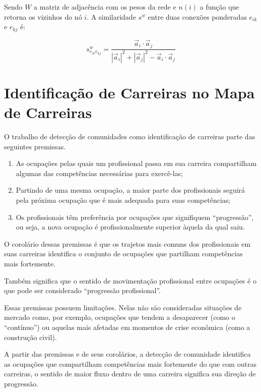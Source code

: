 \documentclass[
  article,
  11pt,
  a4paper,
  english,
  brazil,
  sumario=tradicional]{abntex2}
\begin{document}
Sendo $W$ a matriz de adjacência com os pesos da rede e $n(i)$ a função que retorna os vizinhos do nó $i$. A similaridade $s^w$ entre duas conexões ponderadas $e_{ik}$ e $e_{kj}$ é:

\begin{equation}
s^w_{e_{ik} e_{kj}} = \frac{\vec{a}_i \cdot \vec{a}_j}
           {|\vec{a}_i|^2 + |\vec{a}_j|^2 - \vec{a}_i \cdot \vec{a}_j}
\end{equation}

\section{Identificação de Carreiras no Mapa de Carreiras}

O trabalho de detecção de comunidades como identificação de carreiras parte das seguintes premissas.

\begin{enumerate}
  \item As ocupações pelas quais um profissional passa em sua carreira compartilham algumas das competências necessárias para exercê-las;
  \item Partindo de uma mesma ocupação, a maior parte dos profissionais seguirá pela próxima ocupação que é mais adequada para suas competências;
  \item Os profissionais têm preferência por ocupações que signifiquem \enquote{progressão}, ou seja, a nova ocupação é profissionalmente superior àquela da qual saiu.
\end{enumerate}

O corolário dessas premissas é que os trajetos mais comuns dos profissionais em suas carreiras identifica o conjunto de ocupações que partilham competências mais fortemente.

Também significa que o sentido de movimentação profissional entre ocupações é o que pode ser considerado \enquote{progressão profissional}.

Essas premissas possuem limitações. Nelas não são consideradas situações de mercado como, por exemplo, ocupações que tendem a desaparecer (como o \enquote{contínuo}) ou aquelas mais afetadas em momentos de crise econômica (como a construção civil).

A partir das premissas e de seus corolários, a detecção de comunidade identifica as ocupações que compartilham competências mais fortemente do que com outras carreiras, o sentido de maior fluxo dentro de uma carreira significa sua direção de progressão.
\end{document}

